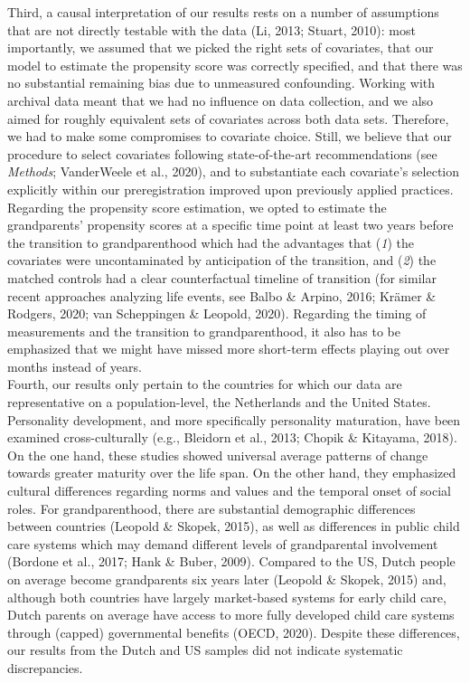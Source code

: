 \documentclass[
  english,
  man, noextraspace]{apa7}
\begin{document}
Third, a causal interpretation of our results rests on a number of assumptions that are not directly testable with the data (Li, 2013; Stuart, 2010): most importantly, we assumed that we picked the right sets of covariates, that our model to estimate the propensity score was correctly specified, and that there was no substantial remaining bias due to unmeasured confounding. Working with archival data meant that we had no influence on data collection, and we also aimed for roughly equivalent sets of covariates across both data sets. Therefore, we had to make some compromises to covariate choice. Still, we believe that our procedure to select covariates following state-of-the-art recommendations (see \emph{Methods}; VanderWeele et al., 2020), and to substantiate each covariate's selection explicitly within our preregistration improved upon previously applied practices. Regarding the propensity score estimation, we opted to estimate the grandparents' propensity scores at a specific time point at least two years before the transition to grandparenthood which had the advantages that (\emph{1}) the covariates were uncontaminated by anticipation of the transition, and (\emph{2}) the matched controls had a clear counterfactual timeline of transition (for similar recent approaches analyzing life events, see Balbo \& Arpino, 2016; Krämer \& Rodgers, 2020; van Scheppingen \& Leopold, 2020). Regarding the timing of measurements and the transition to grandparenthood, it also has to be emphasized that we might have missed more short-term effects playing out over months instead of years.\\
Fourth, our results only pertain to the countries for which our data are representative on a population-level, the Netherlands and the United States. Personality development, and more specifically personality maturation, have been examined cross-culturally (e.g., Bleidorn et al., 2013; Chopik \& Kitayama, 2018). On the one hand, these studies showed universal average patterns of change towards greater maturity over the life span. On the other hand, they emphasized cultural differences regarding norms and values and the temporal onset of social roles. For grandparenthood, there are substantial demographic differences between countries (Leopold \& Skopek, 2015), as well as differences in public child care systems which may demand different levels of grandparental involvement (Bordone et al., 2017; Hank \& Buber, 2009). Compared to the US, Dutch people on average become grandparents six years later (Leopold \& Skopek, 2015) and, although both countries have largely market-based systems for early child care, Dutch parents on average have access to more fully developed child care systems through (capped) governmental benefits (OECD, 2020). Despite these differences, our results from the Dutch and US samples did not indicate systematic discrepancies.\\
\end{document}
